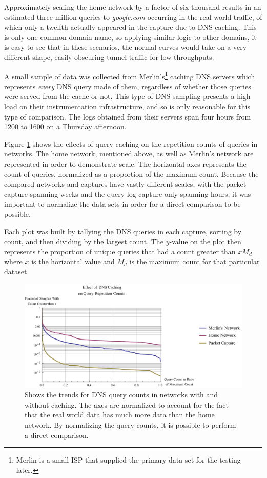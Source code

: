 \documentclass{llncs}
\begin{document}
Approximately scaling the home network by a factor of six thousand results in an
estimated three million queries to \emph{google.com} occurring in the real world
traffic, of which only a twelfth actually appeared in the capture due to
DNS caching. This is only one common domain name, so applying similar logic to
other domains, it is easy to see that in these scenarios, the normal curves
would take on a very different shape, easily obscuring tunnel traffic for low
throughputs.

A small sample of data was collected from Merlin's\footnote{Merlin is a small ISP that supplied the primary data set for the testing later.} caching DNS servers which
represents \emph{every} DNS query made of them, regardless of whether those
queries were served from the cache or not. This type of DNS sampling presents a
high load on their instrumentation infrastructure, and so is only reasonable for
this type of comparison. The logs obtained from their servers span four hours
from 1200 to 1600 on a Thursday afternoon.

Figure \ref{caching} shows the effects of query caching on the repetition counts
of queries in networks. The home network, mentioned above, as well as Merlin's
network are represented in order to demonstrate scale. The horizontal axes
represents the count of queries, normalized as a proportion of the maximum
count. Because the compared networks and captures have vastly different scales,
with the packet capture spanning weeks and the query log capture only spanning
hours, it was important to normalize the data sets in order for a direct
comparison to be possible.

Each plot was built by tallying the DNS queries in each capture, sorting by
count, and then dividing by the largest count. The $y$-value on the plot then
represents the proportion of unique queries that had a count greater than $xM_d$
where $x$ is the horizontal value and $M_d$ is the maximum count for that particular
dataset.

\begin{figure}[h]
\centering
\includegraphics[width=\textwidth]{../figures/caching.pdf}
\caption[Effect of DNS Caching on Query Counts]{Shows the trends for DNS query
counts in networks with and without caching. The axes are normalized to account
for the fact that the real world data has much more data than the home network.
By normalizing the query counts, it is possible to perform a direct comparison.}
\label{caching}
\end{figure}
\end{document}
